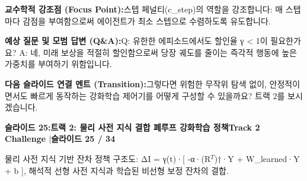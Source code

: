 \documentclass[11pt,a4paper]{article}
\begin{document}
\vspace{0.2em}
\begin{tcolorbox}[colback=lightbg,colframe=bordergray,left=6pt,right=6pt,top=3pt,bottom=3pt,boxrule=0.6pt,arc=2.5pt]
\small
\noindent\textbf{\color{navy}교수학적 강조점 (Focus Point):}\enspace 스텝 페널티(c\_step)의 역할을 강조합니다: 매 스텝마다 감점을 부여함으로써 에이전트가 최소 스텝으로 수렴하도록 유도합니다.\par\vspace{0.3em}
\noindent\textbf{\color{successgreen}예상 질문 및 모범 답변 (Q\&A):}\enspace Q: 유한한 에피소드에서도 할인율 γ < 1이 필요한가요? A: 네, 미래 보상을 적절히 할인함으로써 당장 궤도를 줄이는 즉각적 행동에 높은 가중치를 부여하기 위함입니다.\par\vspace{0.3em}
\noindent\textbf{\color{accent}다음 슬라이드 연결 멘트 (Transition):}\enspace 그렇다면 위험한 무작위 탐색 없이, 안정적이면서도 빠르게 동작하는 강화학습 제어기를 어떻게 구성할 수 있을까요? 트랙 2를 보시겠습니다.
\end{tcolorbox}
\clearpage
\hypertarget{slide.25}{}
{}
\noindent\begin{tcolorbox}[colback=navy,colframe=navy,left=6pt,right=6pt,top=3pt,bottom=3pt,boxrule=0pt,arc=2pt]
{\large\bfseries\color{white}슬라이드 25:\enspace 트랙 2: 물리 사전 지식 결합 폐루프 강화학습 정책}\hfill{\footnotesize\bfseries\color{white!85!lightbg}Track 2 Challenge \enspace$|$\enspace 슬라이드 25 / 34}
\end{tcolorbox}
\vspace{0.2em}
\begin{tcolorbox}[colback=lightbg,colframe=bordergray,title={\footnotesize\bfseries\color{darkgray}슬라이드 시각 구성 요약},fontupper=\small,left=6pt,right=6pt,top=2.5pt,bottom=2.5pt,boxrule=0.6pt,arc=2.5pt]
물리 사전 지식 기반 잔차 정책 구조도: ΔI = γ(t)·[ -α·(R$^T$)†·Y + W\_learned·Y + b ], 해석적 선형 사전 지식과 학습된 비선형 보정 잔차의 결합.
\end{tcolorbox}
\vspace{0.2em}
\end{document}
